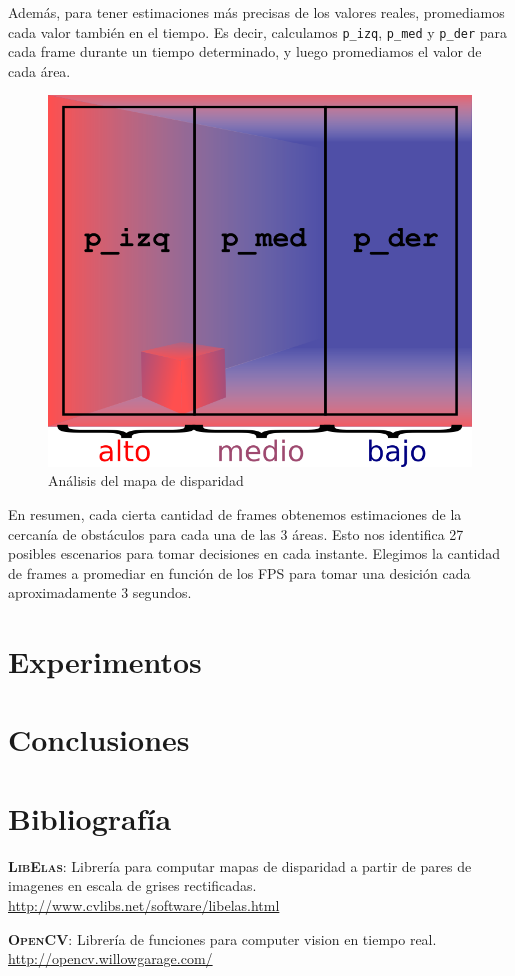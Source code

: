 \documentclass[journal,a4paper]{IEEEtran}
\newcommand{\tit}[1]{\textsc{\textbf{#1}}}
\begin{document}
Además, para tener estimaciones más precisas de los valores reales, promediamos cada valor también en el tiempo. Es decir, calculamos \texttt{p\_izq}, \texttt{p\_med} y \texttt{p\_der} para cada frame durante un tiempo determinado, y luego promediamos el valor de cada área.

\begin{figure}[h!]
    \centering
    \includegraphics[width=0.9\linewidth]{disparidad.png}
    \caption{Análisis del mapa de disparidad}
    \label{fig_exa}
\end{figure}

En resumen, cada cierta cantidad de frames obtenemos estimaciones de la cercanía de obstáculos para cada una de las 3 áreas. Esto nos identifica 27 posibles escenarios para tomar decisiones en cada instante. Elegimos la cantidad de frames a promediar en función de los FPS para tomar una desición cada aproximadamente 3 segundos.
\section{Experimentos}

\section{Conclusiones}

\section{Bibliografía}

\tit{LibElas}: Librería para computar mapas de disparidad a partir de pares de imagenes en escala de grises rectificadas. \url{http://www.cvlibs.net/software/libelas.html}

\bigskip

\tit{OpenCV}: Librería de funciones para computer vision en tiempo real. \url{http://opencv.willowgarage.com/}
\end{document}
